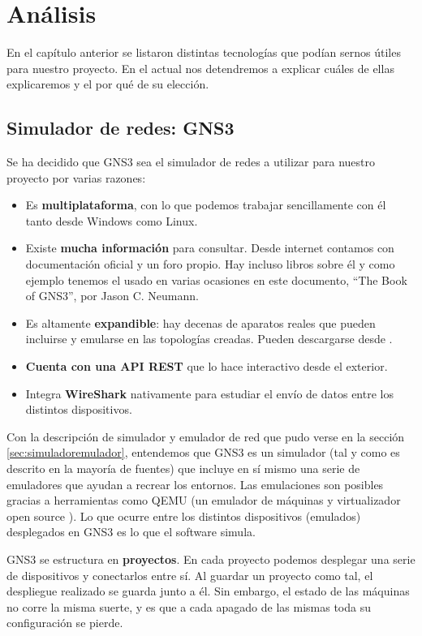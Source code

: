 \chapter{Análisis}\label{chap:Analisis}
En el capítulo anterior se listaron distintas tecnologías que podían sernos útiles para nuestro proyecto. En el actual nos detendremos a explicar cuáles de ellas explicaremos y el por qué de su elección.

\section{Simulador de redes: GNS3}
Se ha decidido que GNS3 sea el simulador de redes a utilizar para nuestro proyecto por varias razones:
\begin{itemize}
\item Es \textbf{multiplataforma}, con lo que podemos trabajar sencillamente con él tanto desde Windows como Linux.
\item Existe \textbf{mucha información} para consultar. Desde internet contamos con documentación oficial y un foro propio. Hay incluso libros sobre él y como ejemplo tenemos el usado en varias ocasiones en este documento, ``The Book of GNS3'', por Jason C. Neumann.
\item Es altamente \textbf{expandible}: hay decenas de aparatos reales que pueden incluirse y emularse en las topologías creadas. Pueden descargarse desde .
\item \textbf{Cuenta con una API REST} que lo hace interactivo desde el exterior.
\item Integra \textbf{WireShark} nativamente para estudiar el envío de datos entre los distintos dispositivos.
\end{itemize}

Con la descripción de simulador y emulador de red que pudo verse en la sección \ref{sec:simuladoremulador}, entendemos que GNS3 es un simulador (tal y como es descrito en la mayoría de fuentes) que incluye en sí mismo una serie de emuladores que ayudan a recrear los entornos. Las emulaciones son posibles gracias a herramientas como QEMU (un emulador de máquinas y virtualizador open source \cite{qemu}). Lo que ocurre entre los distintos dispositivos (emulados) desplegados en GNS3 es lo que el software simula.

GNS3 se estructura en \textbf{proyectos}. En cada proyecto podemos desplegar una serie de dispositivos y conectarlos entre sí. Al guardar un proyecto como tal, el despliegue realizado se guarda junto a él. Sin embargo, el estado de las máquinas no corre la misma suerte, y es que a cada apagado de las mismas toda su configuración se pierde.

